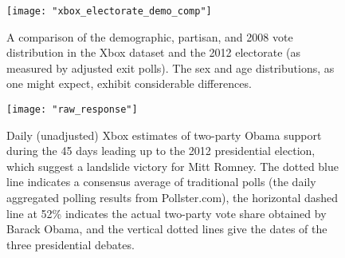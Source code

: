 \begin{figure}[p!]
  \centering
  \texttt{[image: "xbox\_electorate\_demo\_comp"]}
  \caption{A comparison of the demographic, partisan, and 2008 vote
    distribution in the Xbox dataset and the 2012 electorate (as
    measured by adjusted exit polls). The sex and age distributions, as one might expect, exhibit
  considerable differences.}
  \label{fig:demo_comp}
\end{figure}

\begin{figure}[p!]
  \centering
  \texttt{[image: "raw\_response"]}
  \caption{Daily (unadjusted) Xbox estimates of two-party Obama support during
    the 45 days leading up to the 2012 presidential election, which suggest a
    landslide victory for Mitt Romney. The dotted blue line indicates a
    consensus average of traditional polls (the daily aggregated polling results from Pollster.com), the horizontal dashed line at 52\%
    indicates the actual two-party vote share obtained by Barack Obama, and the
    vertical dotted lines give the dates of the three presidential debates.}
  \label{fig:raw_responses}
\end{figure}

